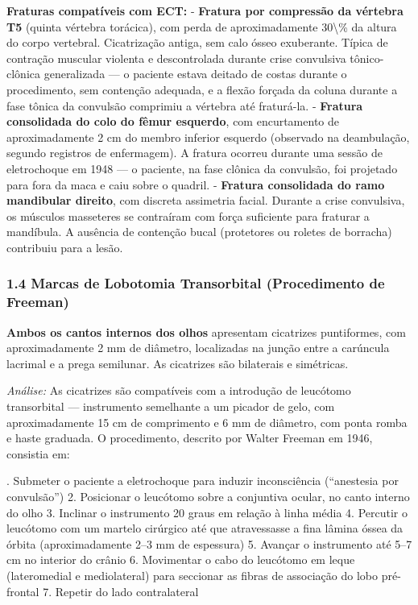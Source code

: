 \noindent \textbf{Fraturas compatíveis com ECT:}
- \textbf{Fratura por compressão da vértebra T5} (quinta vértebra torácica), com perda de aproximadamente 30\textbackslash{}\% da altura do corpo vertebral. Cicatrização antiga, sem calo ósseo exuberante. Típica de contração muscular violenta e descontrolada durante crise convulsiva tônico-clônica generalizada --- o paciente estava deitado de costas durante o procedimento, sem contenção adequada, e a flexão forçada da coluna durante a fase tônica da convulsão comprimiu a vértebra até fraturá-la.
- \textbf{Fratura consolidada do colo do fêmur esquerdo}, com encurtamento de aproximadamente 2 cm do membro inferior esquerdo (observado na deambulação, segundo registros de enfermagem). A fratura ocorreu durante uma sessão de eletrochoque em 1948 --- o paciente, na fase clônica da convulsão, foi projetado para fora da maca e caiu sobre o quadril.
- \textbf{Fratura consolidada do ramo mandibular direito}, com discreta assimetria facial. Durante a crise convulsiva, os músculos masseteres se contraíram com força suficiente para fraturar a mandíbula. A ausência de contenção bucal (protetores ou roletes de borracha) contribuiu para a lesão.

\subsubsection*{1.4 Marcas de Lobotomia Transorbital (Procedimento de Freeman)}

\noindent \textbf{Ambos os cantos internos dos olhos} apresentam cicatrizes puntiformes, com aproximadamente 2 mm de diâmetro, localizadas na junção entre a carúncula lacrimal e a prega semilunar. As cicatrizes são bilaterais e simétricas.

\noindent \textit{Análise:} As cicatrizes são compatíveis com a introdução de leucótomo transorbital --- instrumento semelhante a um picador de gelo, com aproximadamente 15 cm de comprimento e 6 mm de diâmetro, com ponta romba e haste graduada. O procedimento, descrito por Walter Freeman em 1946, consistia em:

. Submeter o paciente a eletrochoque para induzir inconsciência (``anestesia por convulsão'')
2. Posicionar o leucótomo sobre a conjuntiva ocular, no canto interno do olho
3. Inclinar o instrumento 20 graus em relação à linha média
4. Percutir o leucótomo com um martelo cirúrgico até que atravessasse a fina lâmina óssea da órbita (aproximadamente 2--3 mm de espessura)
5. Avançar o instrumento até 5--7 cm no interior do crânio
6. Movimentar o cabo do leucótomo em leque (lateromedial e mediolateral) para seccionar as fibras de associação do lobo pré-frontal
7. Repetir do lado contralateral

